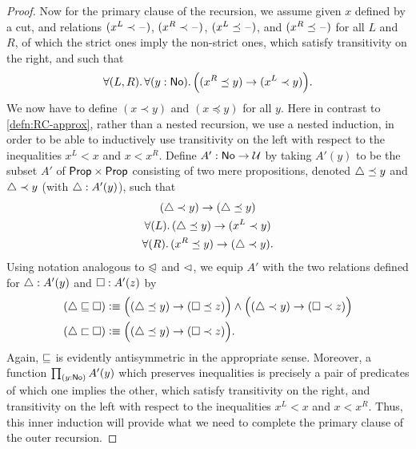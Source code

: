 \begin{proof}
  Now for the primary clause of the recursion, we assume given $x$ defined by a cut, and relations $(x^L \prec \mathord{\hspace{1pt}\text{--}\hspace{1pt}})$, $(x^R \prec \mathord{\hspace{1pt}\text{--}\hspace{1pt}})$, $(x^L \preceq \mathord{\hspace{1pt}\text{--}\hspace{1pt}})$, and $(x^R \preceq \mathord{\hspace{1pt}\text{--}\hspace{1pt}})$ for all $L$ and $R$, of which the strict ones imply the non-strict ones, which satisfy transitivity on the right, and such that
  \begin{equation}\label{eq:NO-prec-outer-IH}
    \fall{L,R}{y:\NO}\Big( (x^R\preceq y) \to (x^L \prec y) \Big).
  \end{equation}
  We now have to define $(x\prec y)$ and $(x\preceq y)$ for all $y$.
  Here in contrast to \autoref{defn:RC-approx}, rather than a nested recursion, we use a nested induction, in order to be able to inductively use transitivity on the left with respect to the inequalities $x^L<x$ and $x<x^R$.
  Define $A':\mathsf{No}\to\mathcal{U}$ by taking $A'(y)$ to be the subset $A'$ of $\mathsf{Prop}\times\mathsf{Prop}$ consisting of two mere propositions, denoted $\triangle\preceq y$ and $\triangle\prec y$ (with $\triangle:A'(y)$), such that
  \begin{gather}
    (\tlt y) \to (\tle y)\\
    \fall{L} (\tle y)\to (x^L\prec y) \label{eq:NO-prec-IHL}\\
    \fall{R} (x^R \preceq y) \to (\tlt y) \label{eq:NO-prec-IHR}.
  \end{gather}
  Using notation analogous to $\trianglelefteqslant$ and $\vartriangleleft$, we equip $A'$ with the two relations defined for $\triangle:A'(y)$ and $\square:A'(z)$ by
  \begin{align*}
    (\tlname \bble \tlbname) &\defeq
    \Big((\tle y) \to (\tleb z)\Big) \land \Big((\tlt y) \to (\tltb z)\Big)\\
    (\tlname \bblt \tlbname) &\defeq
    \Big((\tle y) \to (\tltb z)\Big). %
  \end{align*}
  Again, $\sqsubseteq$ is evidently antisymmetric in the appropriate sense.
  Moreover, a function $\prd{y:\NO} A'(y)$ which preserves inequalities is precisely a pair of predicates of which one implies the other, which satisfy transitivity on the right, and transitivity on the left with respect to the inequalities $x^L<x$ and $x<x^R$.
  Thus, this inner induction will provide what we need to complete the primary clause of the outer recursion.


\end{proof}
